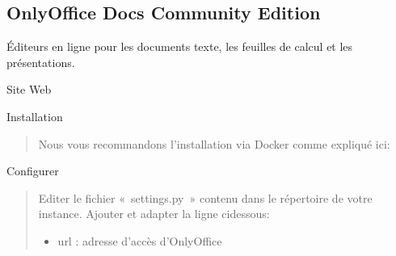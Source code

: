 \documentclass[a4paper,10pt,oneside,french]{sphinxmanual}
\begin{document}
\noindent{}


\subsection{OnlyOffice Docs Community Edition}
\label{\detokenize{documents/editor:onlyoffice-docs-community-edition}}
\sphinxAtStartPar
Éditeurs en ligne pour les documents texte, les feuilles de calcul et les présentations.

\sphinxAtStartPar
Site Web
\begin{quote}

\sphinxAtStartPar
{}
\end{quote}

\sphinxAtStartPar
Installation
\begin{quote}

\sphinxAtStartPar
Nous vous recommandons l’installation via Docker comme expliqué ici:
\end{quote}

\sphinxAtStartPar
Configurer
\begin{quote}

\sphinxAtStartPar
Editer le fichier « settings.py » contenu dans le répertoire de votre instance.
Ajouter et adapter la ligne ci\sphinxhyphen{}dessous:
\begin{itemize}
\item {} 
\sphinxAtStartPar
url : adresse d’accès d’OnlyOffice

\end{itemize}
\end{quote}

\begin{sphinxVerbatim}[commandchars=\\\{\}]
   
\end{sphinxVerbatim}
\end{document}
